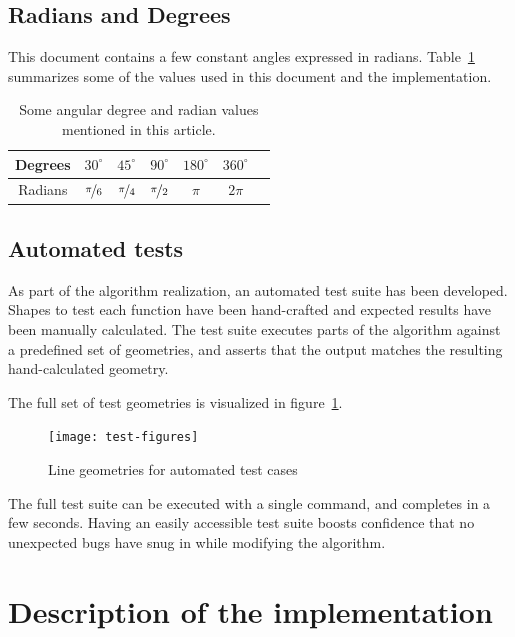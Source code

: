 \documentclass[a4paper]{article}
\begin{document}
\subsection{Radians and Degrees}

This document contains a few constant angles expressed in radians.
Table~\ref{table:radians} summarizes some of the values used in this document
and the implementation.

\begin{table}[h]
    \centering
    \begin{tabular}{|c|c|c|c|c|c|c|}
        \hline
        Degrees & $30^\circ$          & $45^\circ$          & $90^\circ$          & $180^\circ$ & $360^\circ$ \\
        \hline
        Radians & $\nicefrac{\pi}{6}$ & $\nicefrac{\pi}{4}$ & $\nicefrac{\pi}{2}$ & $\pi$       & $2\pi$ \\
        \hline
    \end{tabular}
    \caption{Some angular degree and radian values mentioned in this article.}
    \label{table:radians}
\end{table}

\subsection{Automated tests}
\label{sec:automated-tests}

As part of the algorithm realization, an automated test suite has been
developed. Shapes to test each function have been hand-crafted and expected
results have been manually calculated. The test suite executes parts of the
algorithm against a predefined set of geometries, and asserts that the output
matches the resulting hand-calculated geometry.

The full set of test geometries is visualized in
figure~\ref{fig:test-figures}.

\begin{figure}[h]
    \centering
    \texttt{[image: test-figures]}
    \caption{Line geometries for automated test cases}
    \label{fig:test-figures}
\end{figure}

The full test suite can be executed with a single command, and completes in a
few seconds. Having an easily accessible test suite boosts confidence that no
unexpected bugs have snug in while modifying the algorithm.

\section{Description of the implementation}
\end{document}
